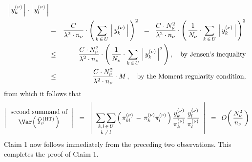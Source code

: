 \begin{eqnarray*}
    \left\vert\,y^{(\nu)}_{k}\,\right\vert
    \cdot
    \left\vert\,y^{(\nu)}_{l}\,\right\vert
\\
& = &
    \dfrac{C}{\lambda^{2} \cdot n_{\nu}}
    \cdot
    \left(\,
        \underset{k\,\in\,U}{\sum}\,
        \left\vert\,y^{(\nu)}_{k}\,\right\vert
        \,\right)^{2}
\;\; = \;\;
    \dfrac{C \cdot N_{\nu}^{2}}{\lambda^{2} \cdot n_{\nu}}
    \cdot
    \left(\,
        \dfrac{1}{N_{\nu}}
        \cdot
        \underset{k\,\in\,U}{\sum}\,
        \left\vert\,y^{(\nu)}_{k}\,\right\vert
        \,\right)^{2}
\\
& \leq &
    \dfrac{C \cdot N_{\nu}^{2}}{\lambda^{2} \cdot n_{\nu}}
    \cdot
    \left(\,
        \dfrac{1}{N_{\nu}}
        \cdot
        \underset{k\,\in\,U}{\sum}\,
        \left\vert\,y^{(\nu)}_{k}\,\right\vert^{2}
        \,\right),
    \quad
    \textnormal{by Jensen's inequality}
\\
& \leq &
    \dfrac{C \cdot N_{\nu}^{2}}{\lambda^{2} \cdot n_{\nu}}
    \cdot
    M\,,
    \quad
    \textnormal{by the Moment regularity condition},
\end{eqnarray*}
from which it follows that
\begin{equation*}
\left\vert\,\begin{array}{c}
    \textnormal{second summand of}
    \\
    \Var\!\left(\,\widehat{Y}^{\textnormal{(HT)}}_{\nu}\,\right)
    \end{array}\,\right\vert
\;\; = \;\;
    \left\vert\;\;
        \underset{k\,\neq\,l}{\underset{k,l\,\in\,U}{\sum\sum}}
        \left(\,
            \pi^{(\nu)}_{kl}
            \, - \,
            \pi^{(\nu)}_{k}\pi^{(\nu)}_{l}
            \,\right)
        \dfrac{y^{(\nu)}_{k}}{\pi^{(\nu)}_{k}}
        \,
        \dfrac{y^{(\nu)}_{l}}{\pi^{(\nu)}_{l}}
        \;\;\right\vert
\;\; = \;\;
    O\!\left(\,
        \dfrac{N_{\nu}^{2}}{n_{\nu}}
        \,\right)
\end{equation*}
Claim 1 now follows immediately from the preceding two observations.
This completes the proof of Claim 1.

